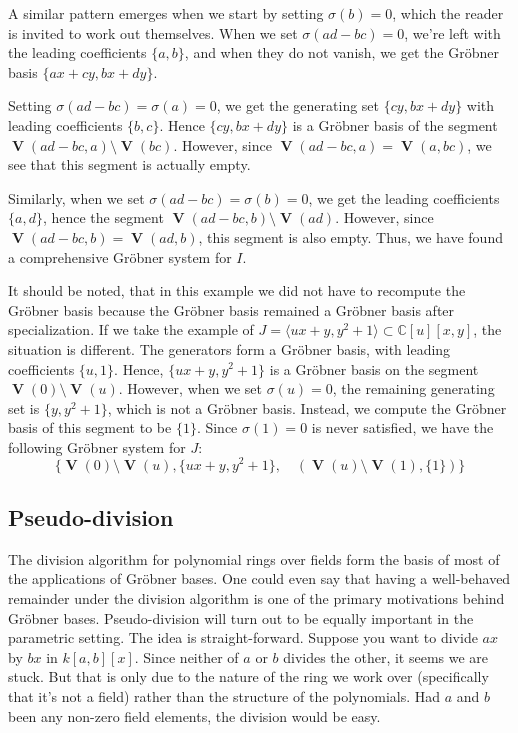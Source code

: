 \documentclass[a4paper, 12pt]{article}
\newcommand{\C}{\mathbb{C}}
\DeclareMathOperator{\V}{\mathbf V}
\theoremstyle{changedot}
\theoremstyle{changedotbreak}
\theoremstyle{nonumberplain}
\begin{document}
\begin{example}
  A similar pattern emerges when we start by setting $\sigma(b) = 0$, which the reader is invited to work out themselves. When we set $\sigma(ad - bc) = 0$, we're left with the leading coefficients $\{a, b\}$, and when they do not vanish, we get the Gröbner basis $\{ax + cy, bx + dy\}$.

  Setting $\sigma(ad - bc) = \sigma(a) = 0$, we get the generating set $\{cy, bx + dy\}$ with leading coefficients $\{b, c\}$. Hence $\{cy, bx + dy\}$ is a Gröbner basis of the segment $\V(ad - bc, a) \setminus \V(bc)$. However, since $\V(ad - bc, a) = \V(a, bc)$, we see that this segment is actually empty.

  Similarly, when we set $\sigma(ad - bc) = \sigma(b) = 0$, we get the leading coefficients $\{a, d\}$, hence the segment $\V(ad - bc, b) \setminus \V(ad)$. However, since $\V(ad - bc, b) = \V(ad, b)$, this segment is also empty. Thus, we have found a comprehensive Gröbner system for $I$.

  It should be noted, that in this example we did not have to recompute the Gröbner basis because the Gröbner basis remained a Gröbner basis after specialization. If we take the example of $J = \langle ux + y, y^{2} + 1 \rangle \subset \C[u][x, y]$, the situation is different. The generators form a Gröbner basis, with leading coefficients $\{u, 1\}$. Hence, $\{ux + y, y^{2} + 1\}$ is a Gröbner basis on the segment $\V(0) \setminus \V(u)$. However, when we set $\sigma(u) = 0$, the remaining generating set is $\{y, y^{2} + 1\}$, which is not a Gröbner basis. Instead, we compute the Gröbner basis of this segment to be $\{1\}$. Since $\sigma(1) = 0$ is never satisfied, we have the following Gröbner system for $J$:
  \[\{\V(0) \setminus \V(u), \{ux + y, y^{2} + 1\}, \quad (\V(u) \setminus \V(1), \{1\})\}\]
\end{example}


\subsection{Pseudo-division}
The division algorithm for polynomial rings over fields form the basis of most of the applications of Gröbner bases. One could even say that having a well-behaved remainder under the division algorithm is one of the primary motivations behind Gröbner bases. Pseudo-division will turn out to be equally important in the parametric setting. The idea is straight-forward. Suppose you want to divide $ax$ by $bx$ in $k[a, b][x]$. Since neither of $a$ or $b$ divides the other, it seems we are stuck. But that is only due to the nature of the ring we work over (specifically that it's not a field) rather than the structure of the polynomials. Had $a$ and $b$ been any non-zero field elements, the division would be easy.
\end{document}
